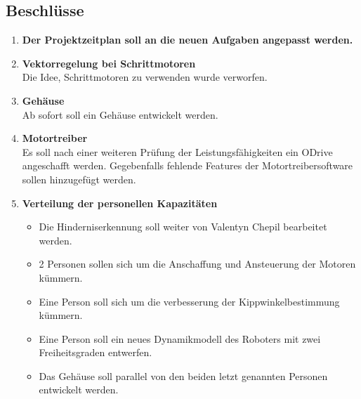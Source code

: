 \documentclass[10pt]{scrartcl}
\begin{document}
\subsection*{Beschlüsse}
	\begin{enumerate}
        \item \textbf{Der Projektzeitplan soll an die neuen Aufgaben angepasst werden.}
        \item \textbf{Vektorregelung bei Schrittmotoren} \\
        Die Idee, Schrittmotoren zu verwenden wurde verworfen.
        \item \textbf{Gehäuse} \\
        Ab sofort soll ein Gehäuse entwickelt werden.
        \item \textbf{Motortreiber} \\
        Es soll nach einer weiteren Prüfung der Leistungsfähigkeiten ein ODrive angeschafft werden. Gegebenfalls fehlende Features der Motortreibersoftware sollen hinzugefügt werden.
        \item \textbf{Verteilung der personellen Kapazitäten}
        \begin{itemize}%
            \item Die Hinderniserkennung soll weiter von Valentyn Chepil bearbeitet werden.
            \item 2 Personen sollen sich um die Anschaffung und Ansteuerung der Motoren kümmern.
            \item Eine Person soll sich um die verbesserung der Kippwinkelbestimmung kümmern.
            \item Eine Person soll ein neues Dynamikmodell des Roboters mit zwei Freiheitsgraden entwerfen.
            \item Das Gehäuse soll parallel von den beiden letzt genannten Personen entwickelt werden.
        \end{itemize}
	\end{enumerate}
\end{document}
